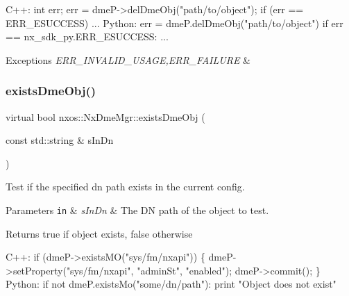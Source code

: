 \begin{DoxyCode}
C++:
    \textcolor{keywordtype}{int} err;
    err = dmeP->delDmeObj(\textcolor{stringliteral}{"path/to/object"});
    \textcolor{keywordflow}{if} (err == ERR\_ESUCCESS) ...
Python:
    err = dmeP.delDmeObj(\textcolor{stringliteral}{"path/to/object"})
    \textcolor{keywordflow}{if} err == nx\_sdk\_py.ERR\_ESUCCESS:
         ...
\end{DoxyCode}



\begin{DoxyExceptions}{Exceptions}
{\em E\+R\+R\+\_\+\+I\+N\+V\+A\+L\+I\+D\+\_\+\+U\+S\+A\+GE,E\+R\+R\+\_\+\+F\+A\+I\+L\+U\+RE} & \\
\hline
\end{DoxyExceptions}
\mbox{\label{classnxos_1_1_nx_dme_mgr_aa21c3fd72667ddbafb2b288e15c89a92}} 
\subsubsection{\texorpdfstring{exists\+Dme\+Obj()}{existsDmeObj()}}
{\footnotesize\ttfamily virtual bool nxos\+::\+Nx\+Dme\+Mgr\+::exists\+Dme\+Obj (\begin{DoxyParamCaption}\item[{const std\+::string \&}]{s\+In\+Dn }\end{DoxyParamCaption})\hspace{0.3cm}{\ttfamily [pure virtual]}}

Test if the specified dn path exists in the current config. 
\begin{DoxyParams}[1]{Parameters}
\mbox{\tt in}  & {\em s\+In\+Dn} & The DN path of the object to test. \\
\hline
\end{DoxyParams}
\begin{DoxyReturn}{Returns}
true if object exists, false otherwise 
\begin{DoxyCode}
C++:
  \textcolor{keywordflow}{if} (dmeP->existsMO(\textcolor{stringliteral}{"sys/fm/nxapi"})) \{
      dmeP->setProperty(\textcolor{stringliteral}{"sys/fm/nxapi"}, \textcolor{stringliteral}{"adminSt"}, \textcolor{stringliteral}{"enabled"});
      dmeP->commit();
  \}
Python:
  \textcolor{keywordflow}{if} not dmeP.existsMo(\textcolor{stringliteral}{"some/dn/path"}):
      print \textcolor{stringliteral}{"Object does not exist"}
\end{DoxyCode}

\end{DoxyReturn}

